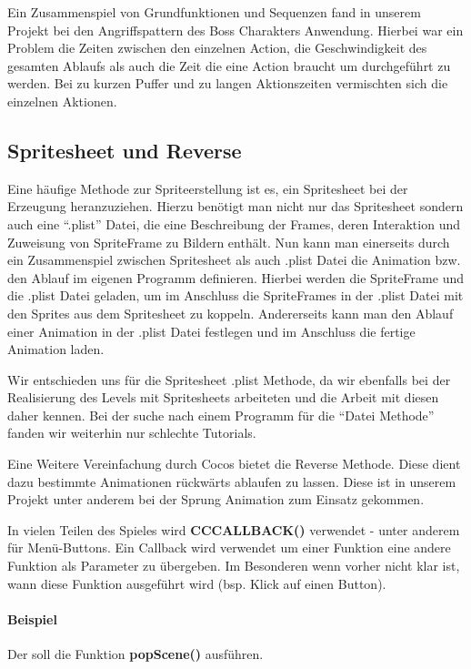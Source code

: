 Ein Zusammenspiel von Grundfunktionen und Sequenzen fand in unserem Projekt bei den Angriffspattern des Boss Charakters Anwendung. Hierbei war ein Problem die Zeiten zwischen den einzelnen Action, die Geschwindigkeit des gesamten Ablaufs als auch die Zeit die eine Action braucht um durchgeführt zu werden. Bei zu kurzen Puffer und zu langen Aktionszeiten vermischten sich die einzelnen Aktionen.



\subsection{Spritesheet und Reverse}

Eine häufige Methode zur Spriteerstellung ist es, ein Spritesheet bei der Erzeugung heranzuziehen. 
Hierzu benötigt man nicht nur das Spritesheet sondern auch eine “.plist” Datei, die eine Beschreibung der Frames, deren Interaktion und Zuweisung von SpriteFrame zu Bildern enthält. Nun kann man einerseits durch ein Zusammenspiel zwischen Spritesheet als auch .plist Datei die Animation bzw. den Ablauf im eigenen Programm definieren. Hierbei werden die SpriteFrame und die .plist Datei geladen, um im Anschluss die SpriteFrames in der .plist Datei mit den Sprites aus dem Spritesheet zu koppeln. Andererseits kann man den Ablauf einer Animation in der .plist Datei festlegen und im Anschluss die fertige Animation laden. 

Wir entschieden uns für die Spritesheet .plist Methode, da wir ebenfalls bei der Realisierung des Levels mit Spritesheets arbeiteten und die Arbeit mit diesen daher kennen. Bei der suche nach einem Programm für die “Datei Methode” fanden wir weiterhin nur schlechte Tutorials. 

Eine Weitere Vereinfachung durch Cocos bietet die Reverse Methode. Diese dient dazu bestimmte Animationen rückwärts ablaufen zu lassen. Diese ist in unserem Projekt unter anderem bei der Sprung Animation zum Einsatz gekommen. 


\label{sec:2_Callbackprinzip}

In vielen Teilen des Spieles wird \textbf{CC\textunderscore CALLBACK()} verwendet - unter anderem für Menü-Buttons. Ein Callback wird verwendet um einer Funktion eine andere Funktion als Parameter zu übergeben. Im Besonderen wenn vorher nicht klar ist, wann diese Funktion ausgeführt wird (bsp. Klick auf einen Button).

\paragraph{Beispiel}
Der  soll die Funktion \textbf{popScene()} ausführen.

